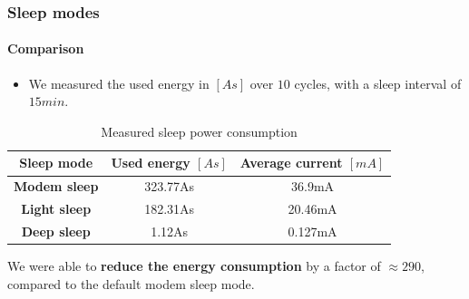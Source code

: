 \begin{frame}
    \frametitle{Sleep modes}
    \framesubtitle{Comparison}

    \begin{itemize}
        \item We measured the used energy in $[As]$ over $10$ cycles, with a sleep interval of $15min$.
    \end{itemize}

    \begin{table}[htbp]
        \caption{Measured sleep power consumption}
        \begin{center}
        \begin{tabular}{|c|c|c|}
        \hline
        \textbf{Sleep mode}&\textbf{Used energy $[As]$}&\textbf{Average current $[mA]$}\\
        \hline
        \textbf{Modem sleep} & 323.77As & 36.9mA\\
        \textbf{Light sleep} & 182.31As & 20.46mA\\
        \textbf{Deep sleep}  & 1.12As   & 0.127mA\\
        \hline
        \end{tabular}
        \label{tab:sleep_modes_15min}
        \end{center}
    \end{table}

    \pause

    \begin{tcolorbox}[title=Energy saving, colback=blue!10, colframe=blue!40]
        We were able to \textbf{reduce the energy consumption} by a factor of \textbf{$\approx 290$}, compared to the default modem sleep mode.
    \end{tcolorbox}
    
\end{frame}